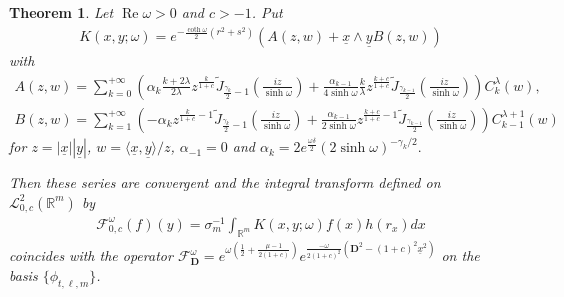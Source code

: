 \documentclass[11pt]{article}
\newtheorem{theorem}{Theorem}
\numberwithin{equation}{section}
\numberwithin{theorem}{section}
\numberwithin{proposition}{section}
\numberwithin{lemma}{section}
\numberwithin{corollary}{section}
\numberwithin{definition}{section}
\numberwithin{example}{section}
\numberwithin{remark}{section}
\numberwithin{note}{section}
\theoremstyle{remark}
\newcommand{\mR}{\mathbb{R}}
\newcommand{\cF}{\mathcal{F}}
\newcommand{\cL}{\mathcal{L}}
\newcommand{\dD}{\textbf{D}}
\newcommand{\ux}{\underline{x}}
\newcommand{\uy}{\underline{y}}
\def\l{{\lambda}}
\def\d{{\delta}}
\def\o{{\omega}}
\def\la{{\langle}}
\def\ra{{\rangle}}
\begin{document}
\begin{theorem}
\label{seriesholom}
Let $\operatorname{Re}\o>0$ and $c>-1$.
Put
\begin{gather*}K(x,y;\omega)=e^{-\frac{\coth{\o}}{2}(r^{2}+s^{2})}\left(A(z,w)+\ux\wedge\uy
B(z,w)\right)
\end{gather*} with
\begin{gather*}
A(z,w) = \sum_{k=0}^{+\infty} \left(\alpha_{k} \frac{k+2\l}{2\l} z^{\frac{k}{1+c}}
\widetilde{J}_{\frac{\gamma_{k}}{2}-1}\left(\frac{iz}{\sinh{\o}}\right) +\frac{
\alpha_{k-1}}{4\sinh{\o}} \frac{k}{\l} z^{\frac{k+c}{1+c}}
\widetilde{J}_{\frac{\gamma_{k-1}}{2}}\left(\frac{iz}{\sinh{\o}}\right)\right) C_{k}^{\l}(w),\\
B(z,w) = \sum_{k=1}^{+\infty} \left(-\alpha_{k} z^{\frac{k}{1+c}-1}
\widetilde{J}_{\frac{\gamma_{k}}{2}-1}\left(\frac{iz}{\sinh{\o}}\right) +
\frac{\alpha_{k-1}}{2\sinh{\o}} z^{\frac{k+c}{1+c}-1}
\widetilde{J}_{\frac{\gamma_{k-1}}{2}}\left(\frac{iz}{\sinh{\o}}\right)\right) C_{k-1}^{\l+1}(w)
\end{gather*}
for $z=|\ux||\uy|$, $w=\la\ux,\uy\ra/z$, $\alpha_{-1}=0$ and
$%
\alpha_{k}=2e^{\frac{\o\d}{2}}(2\sinh{\o})^{-\gamma_{k}/2}.
$%

Then these series are convergent and the integral transform defined on $\cL^{2}_{0,c}(\mR^{m})$ by
\begin{gather*}
\cF_{0,c}^{\o}(f)(y)=\sigma_{m}^{-1}\int_{\mR^{m}}K(x,y;\omega)f(x)h(r_{x})dx
\end{gather*}
coincides with the operator $\cF_{\dD}^{\o}=e^{\o\left(\frac{1}{2}+\frac{\mu-1}{2(1+c)}
\right)}e^{\frac{-\o}{2(1+c)^{2}}\left(\dD^{2}-(1+c)^{2}\ux^{2}\right)}$ on the basis $\{
\phi_{t,\ell,m}\}$.
\end{theorem}
\end{document}
